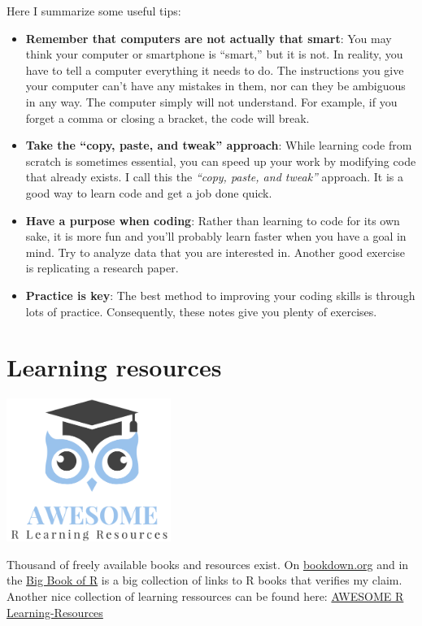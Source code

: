 \documentclass[
  12pt,
  oneside]{book}
\providecommand{\tightlist}{%
  \setlength{\itemsep}{0pt}\setlength{\parskip}{0pt}}
\theoremstyle{definition}
\theoremstyle{definition}
\theoremstyle{definition}
\theoremstyle{definition}
\theoremstyle{remark}
\begin{document}
Here I summarize some useful tips:

\begin{itemize}
\tightlist
\item
  \textbf{Remember that computers are not actually that smart}: You may think your computer or smartphone is ``smart,'' but it is not. In reality, you have to tell a computer everything it needs to do. The instructions you give your computer can't have any mistakes in them, nor can they be ambiguous in any way. The computer simply will not understand. For example, if you forget a comma or closing a bracket, the code will break.
\item
  \textbf{Take the ``copy, paste, and tweak'' approach}: While learning code from scratch is sometimes essential, you can speed up your work by modifying code that already exists. I call this the \emph{``copy, paste, and tweak''} approach. It is a good way to learn code and get a job done quick.\\
\item
  \textbf{Have a purpose when coding}: Rather than learning to code for its own sake, it is more fun and you'll probably learn faster when you have a goal in mind. Try to analyze data that you are interested in. Another good exercise is replicating a research paper.
\item
  \textbf{Practice is key}: The best method to improving your coding skills is through lots of practice. Consequently, these notes give you plenty of exercises.
\end{itemize}

\hypertarget{Rlearninglit}{%
\section{Learning resources}\label{Rlearninglit}}

\includegraphics[width=0.4\textwidth,height=\textheight]{fig/aweres.png}

Thousand of freely available books and resources exist. On \href{https://bookdown.org}{bookdown.org} and in the \href{www.bigbookofr.com}{Big Book of R} is a big collection of links to R books that verifies my claim. Another nice collection of learning ressources can be found here:
\href{https://github.com/iamericfletcher/awesome-r-learning-resources}{AWESOME R Learning-Resources}
\end{document}

